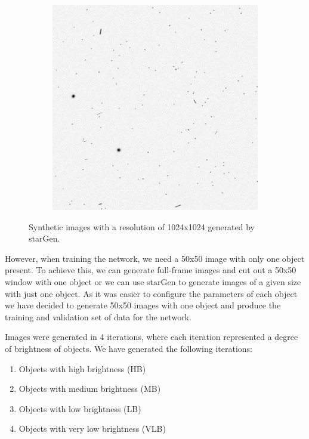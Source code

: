 \begin{figure}[!h]
\begin{subfigure}[t]{.4\textwidth}
        \includegraphics[width=\textwidth]{images/fullframestargen2.jpg}
    \end{subfigure}

    \caption{Synthetic images with a resolution of 1024x1024 generated by starGen.}
    \label{fig:stargenfullframe}
\end{figure}


However, when training the network, we need a 50x50 image with only one object present. To achieve this, we can generate full-frame images and cut out a 50x50 window with one object or we can use starGen to generate images of a given size with just one object. As it was easier to configure the parameters of each object we have decided to generate 50x50 images with one object and produce the training and validation set of data for the network.

Images were generated in 4 iterations, where each iteration represented a degree of brightness of objects. We have generated the following iterations:
\begin{enumerate}
    \item Objects with high brightness (HB)
    \item Objects with medium brightness (MB)
    \item Objects with low brightness (LB)
    \item Objects with very low brightness (VLB)
\end{enumerate}

